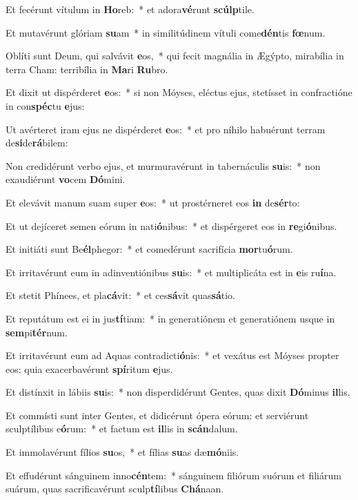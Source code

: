 \item Et fecérunt vítulum in \textbf{Ho}reb:~* et adora\textbf{vé}runt \textbf{scúlp}tile.
\item Et mutavérunt glóriam \textbf{su}am~* in similitúdinem vítuli come\textbf{dén}tis \textbf{fœ}num.
\item Oblíti sunt Deum, qui salvávit \textbf{e}os,~* qui fecit magnália in Ægýpto, mirabília in terra Cham: terribília in \textbf{Ma}ri \textbf{Ru}bro.
\item Et dixit ut dispérderet \textbf{e}os:~* si non Móyses, eléctus ejus, stetísset in confractióne in con\textbf{spéc}tu \textbf{e}jus:
\item Ut avérteret iram ejus ne dispérderet \textbf{e}os:~* et pro níhilo habuérunt terram de\textbf{si}de\textbf{rá}bilem:
\item Non credidérunt verbo ejus, et murmuravérunt in tabernáculis \textbf{su}is:~* non exaudiérunt \textbf{vo}cem \textbf{Dó}mini.
\item Et elevávit manum suam super \textbf{e}os:~* ut prostérneret eos \textbf{in} de\textbf{sér}to:
\item Et ut dejíceret semen eórum in nati\textbf{ó}nibus:~* et dispérgeret eos in \textbf{re}gi\textbf{ó}nibus.
\item Et initiáti sunt Be\textbf{él}phegor:~* et comedérunt sacrifícia \textbf{mor}tu\textbf{ó}rum.
\item Et irritavérunt eum in adinventiónibus \textbf{su}is:~* et multiplicáta est in \textbf{e}is ru\textbf{í}na.
\item Et stetit Phínees, et pla\textbf{cá}vit:~* et ces\textbf{sá}vit quas\textbf{sá}tio.
\item Et reputátum est ei in jus\textbf{tí}tiam:~* in generatiónem et generatiónem usque in \textbf{sem}pi\textbf{tér}num.
\item Et irritavérunt eum ad Aquas contradicti\textbf{ó}nis:~* et vexátus est Móyses propter eos: quia exacerbavérunt \textbf{spí}ritum \textbf{e}jus.
\item Et distínxit in lábiis \textbf{su}is:~* non disperdidérunt Gentes, quas dixit \textbf{Dó}minus \textbf{il}lis.
\item Et commísti sunt inter Gentes, et didicérunt ópera eórum: et serviérunt sculptílibus e\textbf{ó}rum:~* et factum est \textbf{il}lis in \textbf{scán}dalum.
\item Et immolavérunt fílios \textbf{su}os,~* et fílias \textbf{su}as dæ\textbf{mó}niis.
\item Et effudérunt sánguinem inno\textbf{cén}tem:~* sánguinem filiórum suórum et filiárum suárum, quas sacrificavérunt sculp\textbf{tí}libus \textbf{Chá}naan.
